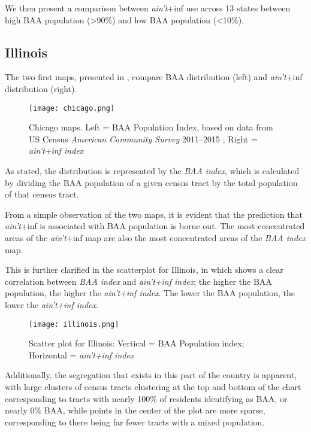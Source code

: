 \documentclass[output=paper,colorlinks,citecolor=brown,draftmode]{langscibook}
\begin{document}
We then present a comparison between \textit{ain't}+inf use across 13 states between high BAA population (>90\%) and low BAA population (<10\%).

\subsection{Illinois}
The two first maps, presented in , compare BAA distribution (left) and \textit{ain't}+inf distribution (right). 

\begin{figure}
    \texttt{[image: chicago.png]}
    \caption{Chicago maps. Left = BAA Population Index, based on data from US Census \textit{American Community Survey} 2011--2015 \citep{bureau2015}; Right = \textit{ain't+inf index}}
    \label{fig:chigago}
\end{figure}

As stated, the distribution is represented by the \textit{BAA index}, which is calculated by dividing the BAA population of a given census tract by the total population of that census tract. 

From a simple observation of the two maps, it is evident that the prediction that \textit{ain't}+inf is associated with BAA population is borne out. The most concentrated areas of the \textit{ain't}+inf map are also the most concentrated areas of the \textit{BAA index} map. 

This is further clarified in the scatterplot for Illinois, in  which shows a clear correlation between \textit{BAA index} and \textit{ain't+inf index}; the higher the BAA population, the higher the \textit{ain't+inf index}.  The lower the BAA population, the lower the \textit{ain't+inf index}. 

\begin{figure}
    \texttt{[image: illinois.png]}
    \caption{Scatter plot for Illinois: Vertical = BAA Population index; Horizontal = \textit{ain't+inf index}}
    \label{fig:illinois}
\end{figure}

Additionally, the segregation that exists in this part of the country is apparent, with large clusters of census tracts clustering at the top and bottom of the chart corresponding to tracts with nearly 100\% of residents identifying as BAA, or nearly 0\% BAA, while points in the center of the plot are more sparse, corresponding to there being far fewer tracts with a mixed population.
\end{document}
